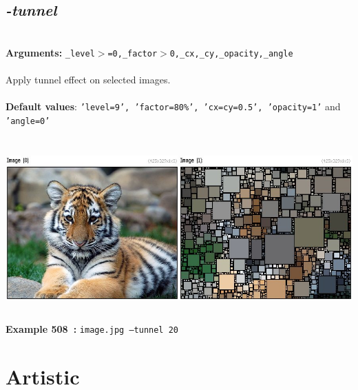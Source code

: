 \documentclass[a4paper,11pt,twoside]{book}
\begin{document}
\subsection{\emph{-tunnel} }\vspace*{-0.5em}
~\\\textbf{Arguments: } 
{\small \texttt{\_level$>$=0,\_factor$>$0,\_cx,\_cy,\_opacity,\_angle}}\\~\\
Apply tunnel effect on selected images.
~\\~\\\textbf{Default values}: {\small \texttt{'level=9', 'factor=80\%', 'cx=cy=0.5', 'opacity=1'} and \texttt{'angle=0'}}
\begin{center}\includegraphics[keepaspectratio=true,height=7cm,width=\textwidth]{img/gmic_def508.jpg}\\
{\footnotesize \textbf{Example 508~:} \texttt{image.jpg --tunnel 20}}
\end{center}
\section{Artistic}
\end{document}
